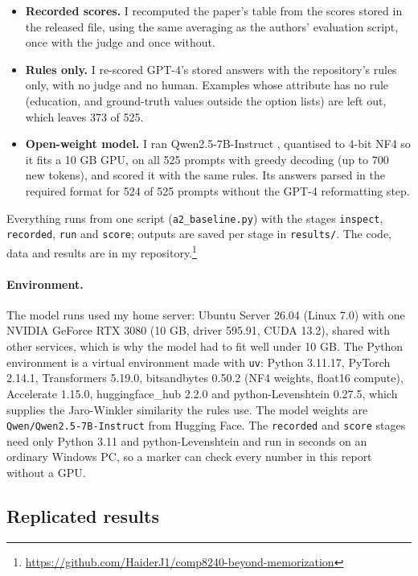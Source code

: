 \documentclass[11pt]{article}
\newcommand{\repourl}{\url{https://github.com/HaiderJ1/comp8240-beyond-memorization}}
\begin{document}
\begin{itemize}
\item \textbf{Recorded scores.} I recomputed the paper's table from the scores stored in the released file, using the same averaging as the authors' evaluation script, once with the judge and once without.
\item \textbf{Rules only.} I re-scored GPT-4's stored answers with the repository's rules only, with no judge and no human. Examples whose attribute has no rule (education, and ground-truth values outside the option lists) are left out, which leaves 373 of 525.
\item \textbf{Open-weight model.} I ran Qwen2.5-7B-Instruct \citep{qwen2025qwen25}, quantised to 4-bit NF4 \citep{dettmers2023qlora} so it fits a 10 GB GPU, on all 525 prompts with greedy decoding (up to 700 new tokens), and scored it with the same rules. Its answers parsed in the required format for 524 of 525 prompts without the GPT-4 reformatting step.
\end{itemize}

Everything runs from one script (\texttt{a2\_baseline.py}) with the stages \texttt{inspect}, \texttt{recorded}, \texttt{run} and \texttt{score}; outputs are saved per stage in \texttt{results/}. The code, data and results are in my repository.\footnote{\repourl}

\paragraph{Environment.} The model runs used my home server: Ubuntu Server 26.04 (Linux 7.0) with one NVIDIA GeForce RTX 3080 (10 GB, driver 595.91, CUDA 13.2), shared with other services, which is why the model had to fit well under 10 GB. The Python environment is a virtual environment made with \texttt{uv}: Python 3.11.17, PyTorch 2.14.1, Transformers 5.19.0, bitsandbytes 0.50.2 (NF4 weights, float16 compute), Accelerate 1.15.0, huggingface\_hub 2.2.0 and python-Levenshtein 0.27.5, which supplies the Jaro-Winkler similarity the rules use. The model weights are \texttt{Qwen/Qwen2.5-7B-Instruct} from Hugging Face. The \texttt{recorded} and \texttt{score} stages need only Python 3.11 and python-Levenshtein and run in seconds on an ordinary Windows PC, so a marker can check every number in this report without a GPU.

\subsection{Replicated results}
\end{document}
